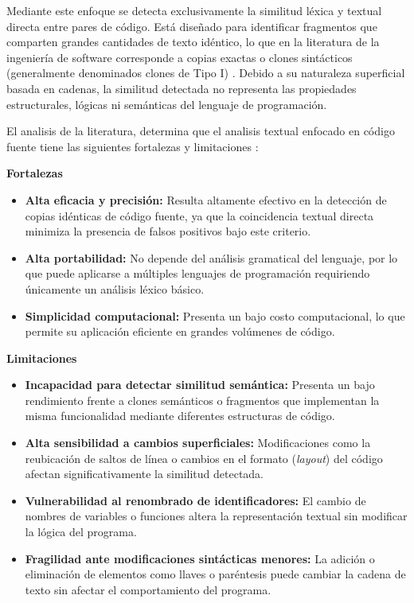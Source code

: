 Mediante este enfoque se detecta exclusivamente la similitud léxica y textual directa entre pares de código\cite{Roy2007Survey}. Está diseñado para identificar fragmentos que comparten grandes cantidades de texto idéntico, lo que en la literatura de la ingeniería de software corresponde a copias exactas o clones sintácticos (generalmente denominados clones de Tipo I) \cite{karakatic2022software}. Debido a su naturaleza superficial basada en cadenas, la similitud detectada no representa las propiedades estructurales, lógicas ni semánticas del lenguaje de programación\cite{Roy2007Survey}.

El analisis de la literatura, determina que el analisis textual enfocado en código fuente tiene las siguientes fortalezas y limitaciones \cite{Roy2007Survey, karakatic2022software}:

\textbf{Fortalezas}
\begin{itemize}
    \item \textbf{Alta eficacia y precisión:} Resulta altamente efectivo en la detección de copias idénticas de código fuente, ya que la coincidencia textual directa minimiza la presencia de falsos positivos bajo este criterio.
    
    \item \textbf{Alta portabilidad:} No depende del análisis gramatical del lenguaje, por lo que puede aplicarse a múltiples lenguajes de programación requiriendo únicamente un análisis léxico básico.
    
    \item \textbf{Simplicidad computacional:} Presenta un bajo costo computacional, lo que permite su aplicación eficiente en grandes volúmenes de código.
\end{itemize}

\textbf{Limitaciones}
\begin{itemize}
    \item \textbf{Incapacidad para detectar similitud semántica:} Presenta un bajo rendimiento frente a clones semánticos o fragmentos que implementan la misma funcionalidad mediante diferentes estructuras de código.
    
    \item \textbf{Alta sensibilidad a cambios superficiales:} Modificaciones como la reubicación de saltos de línea o cambios en el formato (\textit{layout}) del código afectan significativamente la similitud detectada.
    
    \item \textbf{Vulnerabilidad al renombrado de identificadores:} El cambio de nombres de variables o funciones altera la representación textual sin modificar la lógica del programa.
    
    \item \textbf{Fragilidad ante modificaciones sintácticas menores:} La adición o eliminación de elementos como llaves o paréntesis puede cambiar la cadena de texto sin afectar el comportamiento del programa.
\end{itemize}
